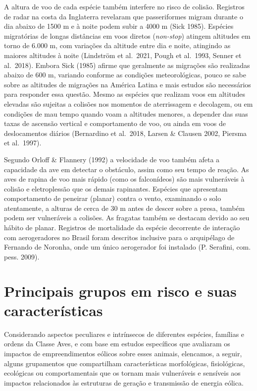 \documentclass[
  oneside]{scrbook}
\begin{document}
A altura de voo de cada espécie também interfere no risco de colisão. Registros de radar na costa da Inglaterra revelaram que passeriformes migram durante o dia abaixo de 1500 m e à noite podem subir a 4000 m (Sick 1985). Espécies migratórias de longas distâncias em voos diretos (\emph{non-stop}) atingem altitudes em torno de 6.000 m, com variações da altitude entre dia e noite, atingindo as maiores altitudes à noite (Lindström et al.~2021, Pough et al.~1993, Senner et al.~2018). Embora Sick (1985) afirme que geralmente as migrações são realizadas abaixo de 600 m, variando conforme as condições meteorológicas, pouco se sabe sobre as altitudes de migrações na América Latina e mais estudos são necessários para responder essa questão. Mesmo as espécies que realizam voos em altitudes elevadas são sujeitas a colisões nos momentos de aterrissagem e decolagem, ou em condições de mau tempo quando voam a altitudes menores, a depender das suas taxas de ascensão vertical e comportamento de voo, ou ainda em voos de deslocamentos diários (Bernardino et al.~2018, Larsen \& Clausen 2002, Piersma et al.~1997).

Segundo Orloff \& Flannery (1992) a velocidade de voo também afeta a capacidade da ave em detectar o obstáculo, assim como seu tempo de reação. As aves de rapina de voo mais rápido (como os falconídeos) são mais vulneráveis à colisão e eletroplessão que os demais rapinantes. Espécies que apresentam comportamento de peneirar (planar) contra o vento, examinando o solo atentamente, a alturas de cerca de 30 m antes de descer sobre a presa, também podem ser vulneráveis a colisões. As fragatas também se destacam devido ao seu hábito de planar. Registros de mortalidade da espécie decorrente de interação com aerogeradores no Brasil foram descritos inclusive para o arquipélago de Fernando de Noronha, onde um único aerogerador foi instalado (P. Serafini, com. pess. 2009).

\hypertarget{principais-grupos-em-risco-e-suas-caracteruxedsticas}{%
\section{Principais grupos em risco e suas características}\label{principais-grupos-em-risco-e-suas-caracteruxedsticas}}

Considerando aspectos peculiares e intrínsecos de diferentes espécies, famílias e ordens da Classe Aves, e com base em estudos específicos que avaliaram os impactos de empreendimentos eólicos sobre esses animais, elencamos, a seguir, alguns grupamentos que compartilham características morfológicas, fisiológicas, ecológicas ou comportamentais que os tornam mais vulneráveis e sensíveis aos impactos relacionados às estruturas de geração e transmissão de energia eólica.
\end{document}
